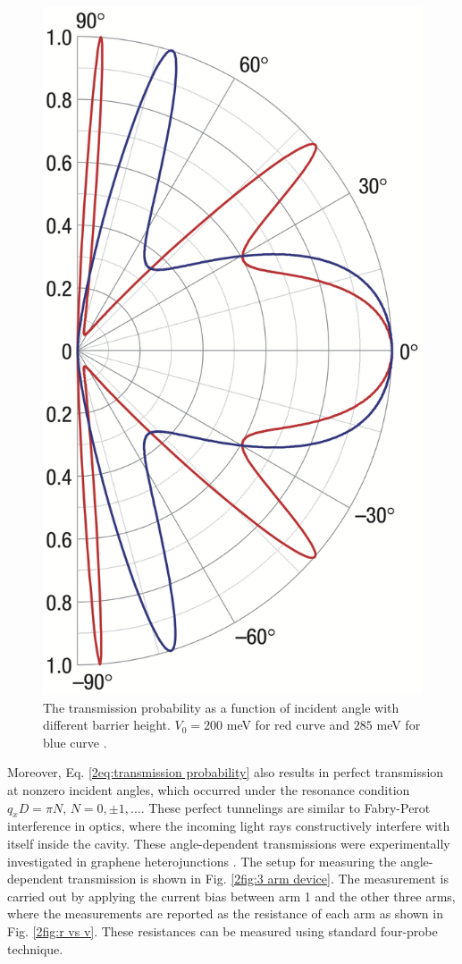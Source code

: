     \begin{figure}[H]
        \centering
        \includegraphics[width = 0.3\linewidth]{fig/Chap 2/klein tunneling.png}
        \caption{The transmission probability as a function of incident angle with different barrier height. 
                    $V_0 = 200$ meV for red curve and $285$ meV for blue curve \cite{Katsnelson2006a}.}
        \label{2fig:Klein tunneling}
    \end{figure}
    Moreover, Eq. \ref{2eq:transmission probability} also results in perfect transmission at nonzero incident angles, which occurred under the resonance condition $q_x D = \pi N$, $N = 0, \pm 1,...$.
    These perfect tunnelings are similar to Fabry-Perot interference in optics, where the incoming light rays constructively interfere with itself inside the cavity.
    These angle-dependent transmissions were experimentally investigated in graphene heterojunctions \cite{Rahman2015}.
    The setup for measuring the angle-dependent transmission is shown in Fig. \ref{2fig:3 arm device}.
    The measurement is carried out by applying the current bias between arm 1 and the other three arms, where the measurements are reported as the resistance of each arm as shown in Fig. \ref{2fig:r vs v}.
    These resistances  can be measured using standard four-probe technique.
